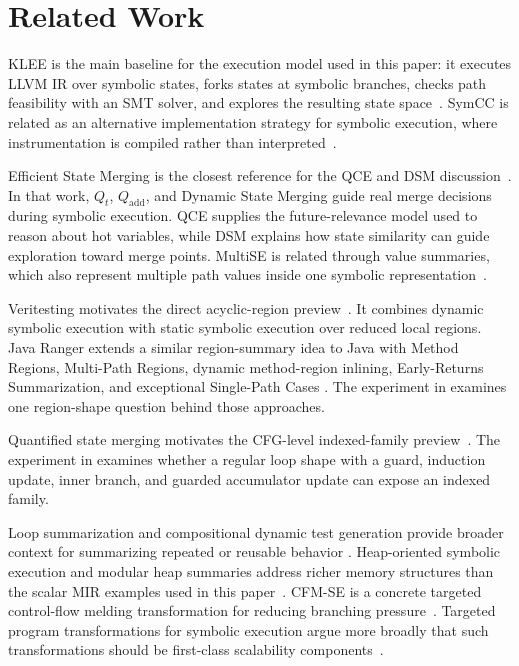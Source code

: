 \documentclass[conference]{IEEEtran}
\begin{document}
\section{Related Work}
\label{sec:related-work}

KLEE is the main baseline for the execution model used in this paper: it
executes LLVM IR over symbolic states, forks states at symbolic branches,
checks path feasibility with an SMT solver, and explores the resulting state
space~\cite{klee}. SymCC is related as an alternative implementation strategy
for symbolic execution, where instrumentation is compiled rather than
interpreted~\cite{symcc}.

Efficient State Merging is the closest reference for the QCE and DSM
discussion~\cite{efficient-merging}. In that work, \(Q_t\), \(Q_{\mathrm{add}}\), and
Dynamic State Merging guide real merge decisions during symbolic execution.
QCE supplies the future-relevance model used to reason about hot variables,
while DSM explains how state similarity can guide exploration toward merge
points. MultiSE is related through value summaries, which also represent
multiple path values inside one symbolic representation~\cite{multise}.

Veritesting motivates the direct acyclic-region preview~\cite{veritesting}. It
combines dynamic symbolic execution with static symbolic execution over
reduced local regions. Java Ranger extends a similar region-summary idea to
Java with Method Regions, Multi-Path Regions, dynamic method-region inlining,
Early-Returns Summarization, and exceptional Single-Path Cases
\cite{java-ranger}. The experiment in  examines one
region-shape question behind those approaches.

Quantified state merging motivates the CFG-level indexed-family
preview~\cite{quantified-merging}. The experiment in 
examines whether a regular loop shape with a guard, induction update, inner
branch, and guarded accumulator update can expose an indexed family.

Loop summarization and compositional dynamic test generation provide broader
context for summarizing repeated or reusable behavior
\cite{loop-summarization,smart-summaries}. Heap-oriented symbolic execution
and modular heap summaries address richer memory structures than the scalar MIR
examples used in this paper~\cite{sep-logic-exec,heap-summaries}.
CFM-SE is a concrete targeted control-flow melding transformation for reducing
branching pressure~\cite{cfm-se}. Targeted program transformations for
symbolic execution argue more broadly that such transformations should be
first-class scalability components~\cite{targeted-transforms}.
\end{document}
